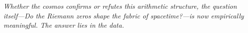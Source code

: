 \documentclass[12pt,a4paper]{article}
\begin{document}

\bigskip
\noindent
\emph{Whether the cosmos confirms or refutes this arithmetic
structure, the question itself---Do the Riemann zeros
shape the fabric of spacetime?---is now empirically
meaningful.
The answer lies in the data.}

\end{document}
